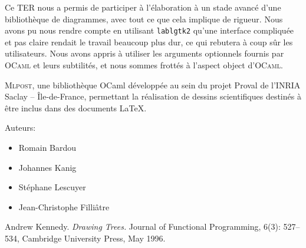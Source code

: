 \documentclass[a4paper,12pt]{article}
\newcommand{\mlpost}{\textsc{Mlpost}}
\begin{document}
Ce TER nous a permis de participer à l'élaboration à un stade avancé d'une bibliothèque de diagrammes, avec tout ce que cela implique de rigueur. Nous avons pu nous rendre compte en utilisant \texttt{lablgtk2} qu'une interface compliquée et pas claire rendait le travail beaucoup plus dur, ce qui rebutera à coup sûr les utilisateurs. Nous avons appris à utiliser les arguments optionnels fournis par \textsc{OCaml} et leurs subtilités, et nous sommes frottés à l'aspect object d'\textsc{OCaml}.

\begin{thebibliography}{99}
 \mlpost, une bibliothèque OCaml développée au sein du projet Proval de l’INRIA Saclay – Île-de-France, permettant la réalisation de dessins scientifiques destinés à être inclus dans des documents \LaTeX.

Auteurs:
\begin{itemize}
    \item Romain Bardou
    \item Johannes Kanig
    \item Stéphane Lescuyer
    \item Jean-Christophe Filliâtre 
\end{itemize}

Andrew Kennedy. 
\emph{Drawing Trees.}
Journal of Functional Programming, 
6(3): 527--534, Cambridge University Press, May 1996.
\end{thebibliography}
\end{document}
